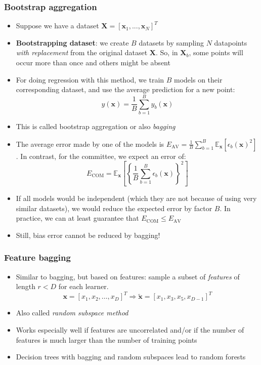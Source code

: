 \subsubsection{Bootstrap aggregation}
\begin{itemize}
	\item Suppose we have a dataset $\bm{X} = \left[\bm{x}_1, ..., \bm{x}_N\right]^T$
	\item \textbf{Bootstrapping dataset}: we create $B$ datasets by sampling $N$ datapoints \textit{with replacement} from the original dataset $\bm{X}$. So, in $\bm{X}_b$, some points will occur more than once and others might be absent
	\item For doing regression with this method, we train $B$ models on their corresponding dataset, and use the average prediction for a new point:
	$$y(\bm{x}) = \frac{1}{B}\sum\limits_{b=1}^{B} y_b(\bm{x})$$
	\item This is called bootstrap aggregation or also \textit{bagging}
	\item The average error made by one of the models is $E_{\text{AV}} = \frac{1}{B}\sum_{b=1}^{B} \mathbb{E}_{\bm{x}}\left[\epsilon_b(\bm{x})^2\right]$. In contrast, for the committee, we expect an error of:
	$$E_{\text{COM}} = \mathbb{E}_{\bm{x}}\left[\left\{\frac{1}{B}\sum\limits_{b=1}^{B}\epsilon_b(\bm{x})\right\}^2\right]$$
	\item If all models would be independent (which they are not because of using very similar datasets), we would reduce the expected error by factor $B$. In practice, we can at least guarantee that $E_{\text{COM}}\leq E_{\text{AV}}$
	\item Still, bias error cannot be reduced by bagging!
\end{itemize}
\subsubsection{Feature bagging}
\begin{itemize}
	\item Similar to bagging, but based on features: sample a subset of \textit{features} of length $r<D$ for each learner. 
	$$\bm{x} = \left[x_1, x_2, \dots, x_D\right]^T\Rightarrow \bm{\tilde{x}} = \left[x_1, x_3, x_5, x_{D-1}\right]^T$$
	\item Also called \textit{random subspace method}
	\item Works especially well if features are uncorrelated and/or if the number of features is much larger than the number of training points
	\item Decision trees with bagging and random subspaces lead to random forests
\end{itemize}

